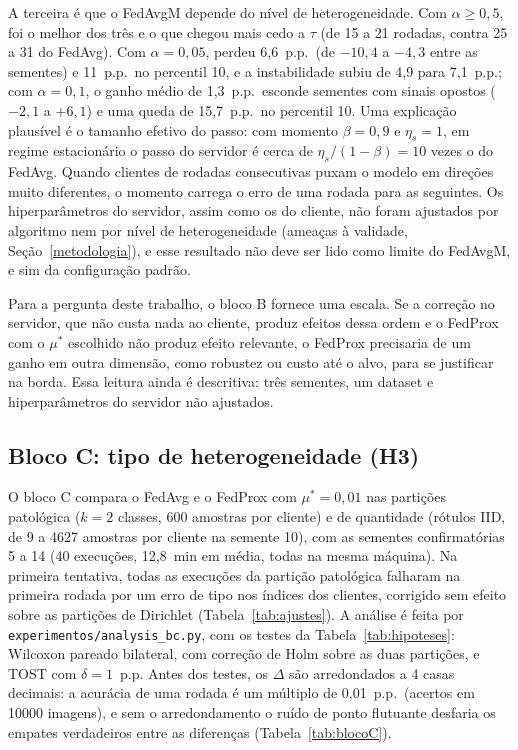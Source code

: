 A terceira é que o FedAvgM depende do nível de heterogeneidade. Com $\alpha \geq 0{,}5$, foi o melhor dos três e o que chegou mais cedo a $\tau$ (de 15 a 21 rodadas, contra 25 a 31 do FedAvg). Com $\alpha = 0{,}05$, perdeu 6,6~p.p.\ (de $-10{,}4$ a $-4{,}3$ entre as sementes) e 11~p.p.\ no percentil 10, e a instabilidade subiu de 4,9 para 7,1~p.p.; com $\alpha = 0{,}1$, o ganho médio de 1,3~p.p.\ esconde sementes com sinais opostos ($-2{,}1$ a $+6{,}1$) e uma queda de 15,7~p.p.\ no percentil 10. Uma explicação plausível é o tamanho efetivo do passo: com momento $\beta = 0{,}9$ e $\eta_s = 1$, em regime estacionário o passo do servidor é cerca de $\eta_s/(1-\beta) = 10$ vezes o do FedAvg. Quando clientes de rodadas consecutivas puxam o modelo em direções muito diferentes, o momento carrega o erro de uma rodada para as seguintes. Os hiperparâmetros do servidor, assim como os do cliente, não foram ajustados por algoritmo nem por nível de heterogeneidade (ameaças à validade, Seção~\ref{metodologia}), e esse resultado não deve ser lido como limite do FedAvgM, e sim da configuração padrão.

Para a pergunta deste trabalho, o bloco B fornece uma escala. Se a correção no servidor, que não custa nada ao cliente, produz efeitos dessa ordem e o FedProx com o $\mu^*$ escolhido não produz efeito relevante, o FedProx precisaria de um ganho em outra dimensão, como robustez ou custo até o alvo, para se justificar na borda. Essa leitura ainda é descritiva: três sementes, um dataset e hiperparâmetros do servidor não ajustados.

\subsection{Bloco C: tipo de heterogeneidade (H3)}
\label{sec:blocoC}

O bloco C compara o FedAvg e o FedProx com $\mu^* = 0{,}01$ nas partições patológica ($k = 2$ classes, 600 amostras por cliente) e de quantidade (rótulos IID, de 9 a \num{4627} amostras por cliente na semente 10), com as sementes confirmatórias 5 a 14 (40 execuções, 12,8~min em média, todas na mesma máquina). Na primeira tentativa, todas as execuções da partição patológica falharam na primeira rodada por um erro de tipo nos índices dos clientes, corrigido sem efeito sobre as partições de Dirichlet (Tabela~\ref{tab:ajustes}). A análise é feita por \texttt{experimentos/analysis\_bc.py}, com os testes da Tabela~\ref{tab:hipoteses}: Wilcoxon pareado bilateral, com correção de Holm sobre as duas partições, e TOST com $\delta = 1$~p.p. Antes dos testes, os $\Delta$ são arredondados a 4 casas decimais: a acurácia de uma rodada é um múltiplo de 0,01~p.p.\ (acertos em \num{10000} imagens), e sem o arredondamento o ruído de ponto flutuante desfaria os empates verdadeiros entre as diferenças (Tabela~\ref{tab:blocoC}).

